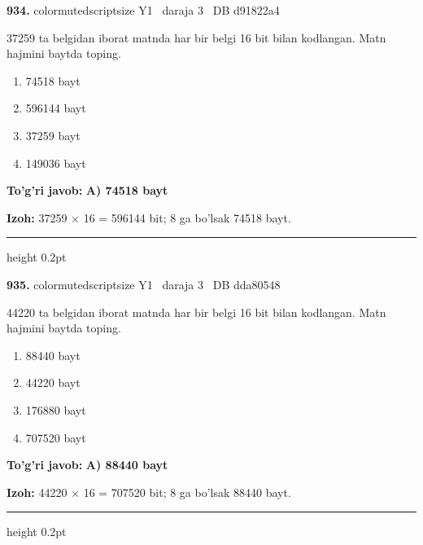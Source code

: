 \documentclass[10pt,a4paper,oneside]{article}
\begin{document}
\noindent\textbf{\color{ink}934.}  {color{muted}scriptsize Y1 \textbullet\ daraja 3 \textbullet\ DB d91822a4}
\par
37259 ta belgidan iborat matnda har bir belgi 16 bit bilan kodlangan. Matn hajmini baytda toping.
\begin{enumerate}[label=\Alph*),leftmargin=9mm]
\item 74518 bayt
\item 596144 bayt
\item 37259 bayt
\item 149036 bayt
\end{enumerate}
\begin{tcolorbox}[enhanced,breakable,colback=teal!4,colframe=teal!50!black,boxrule=0.5pt,arc=1.1mm,left=3mm,right=3mm,top=1.7mm,bottom=1.7mm,before skip=2mm,after skip=2mm]
\textbf{\color{teal}To'g'ri javob:} \textbf{A) 74518 bayt}
\par\smallskip
\textbf{Izoh:} 37259 \ensuremath{\times} 16 = 596144 bit; 8 ga bo'lsak 74518 bayt.
\end{tcolorbox}
\vspace{2mm}\hrule height 0.2pt \vspace{3mm}

\noindent\textbf{\color{ink}935.}  {color{muted}scriptsize Y1 \textbullet\ daraja 3 \textbullet\ DB dda80548}
\par
44220 ta belgidan iborat matnda har bir belgi 16 bit bilan kodlangan. Matn hajmini baytda toping.
\begin{enumerate}[label=\Alph*),leftmargin=9mm]
\item 88440 bayt
\item 44220 bayt
\item 176880 bayt
\item 707520 bayt
\end{enumerate}
\begin{tcolorbox}[enhanced,breakable,colback=teal!4,colframe=teal!50!black,boxrule=0.5pt,arc=1.1mm,left=3mm,right=3mm,top=1.7mm,bottom=1.7mm,before skip=2mm,after skip=2mm]
\textbf{\color{teal}To'g'ri javob:} \textbf{A) 88440 bayt}
\par\smallskip
\textbf{Izoh:} 44220 \ensuremath{\times} 16 = 707520 bit; 8 ga bo'lsak 88440 bayt.
\end{tcolorbox}
\vspace{2mm}\hrule height 0.2pt \vspace{3mm}
\end{document}
